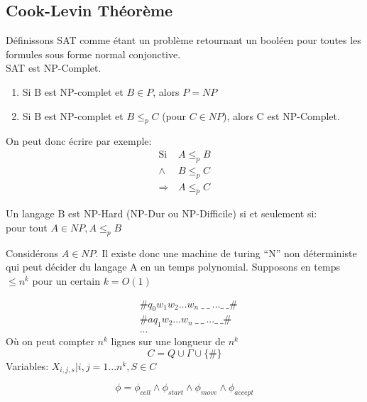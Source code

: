 \documentclass[a4paper,12pt]{article}
\begin{document}
  \subsection{Cook-Levin Théorème}
    Définissons SAT comme étant un problème retournant un booléen pour toutes les formules sous forme normal conjonctive.\\
    SAT est NP-Complet.

    \begin{enumerate}
      \item Si B est NP-complet et $B \in P$, alors $P = NP$
      \item Si B est NP-complet et $B \leq_p C$ (pour $C \in NP$), alors C est NP-Complet.
    \end{enumerate}
    On peut donc écrire par exemple:
    \begin{align*}
      \text{Si } &A \leq_p B\\
      \wedge &B \leq_p C\\
      \Rightarrow &A \leq_p C
    \end{align*}


    \begin{defBox}
      Un langage B est NP-Hard (NP-Dur ou NP-Difficile) si et seulement si:\\
      pour tout $A \in NP, A \leq_p B$
    \end{defBox}
    Considérons $A \in NP$.  Il existe donc une machine de turing ``N'' non déterministe qui peut décider du langage A en un temps polynomial.  Supposons en temps $\leq n^k$ pour un certain $k = O(1)$

    \begin{align*}
      &\# q_0 w_1 w_2 ... w_n\ \_\ \_\ ... \_\ \_\#\\
      &\# a q_1 w_2 ... w_n\ \_\ \_\ ... \_\ \_\#\\
      &...
    \end{align*}
    Où on peut compter $n^k$ lignes sur une longueur de $n^k$\\
    $$C = Q \cup \Gamma \cup \{\#\}$$
    Variables: $X_{i, j, s} | i,j = 1...n^k, S \in C $

    $$\phi = \phi_{cell} \wedge \phi_{start} \wedge \phi_{move} \wedge \phi_{accept}$$
\end{document}
